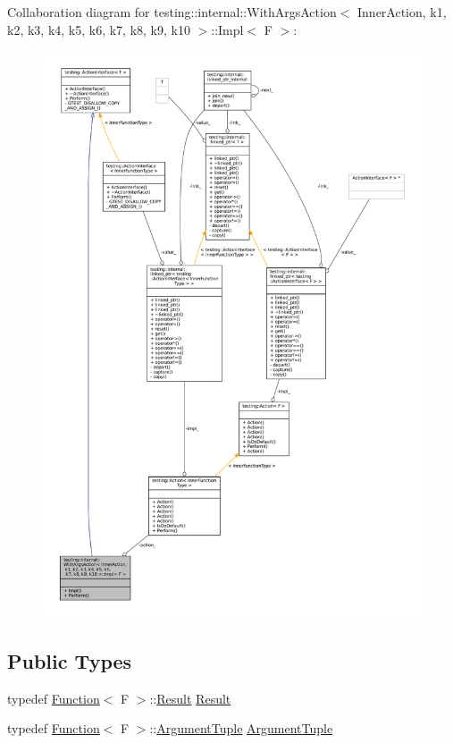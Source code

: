 Collaboration diagram for testing\+:\+:internal\+:\+:With\+Args\+Action$<$ Inner\+Action, k1, k2, k3, k4, k5, k6, k7, k8, k9, k10 $>$\+:\+:Impl$<$ F $>$\+:
\nopagebreak
\begin{figure}[H]
\begin{center}
\leavevmode
\includegraphics[width=350pt]{classtesting_1_1internal_1_1WithArgsAction_1_1Impl__coll__graph}
\end{center}
\end{figure}
\subsection*{Public Types}
\begin{DoxyCompactItemize}
\item 
typedef \hyperlink{structtesting_1_1internal_1_1Function}{Function}$<$ F $>$\+::\hyperlink{classtesting_1_1ActionInterface_a7477de2fe3e4e01c59db698203acaee7}{Result} \hyperlink{classtesting_1_1internal_1_1WithArgsAction_1_1Impl_a967047b99af8f852f4fa2883be283e1a}{Result}
\item 
typedef \hyperlink{structtesting_1_1internal_1_1Function}{Function}$<$ F $>$\+::\hyperlink{classtesting_1_1ActionInterface_af72720d864da4d606629e83edc003511}{Argument\+Tuple} \hyperlink{classtesting_1_1internal_1_1WithArgsAction_1_1Impl_ae75850936c5448a83f79267d6a2f1903}{Argument\+Tuple}
\end{DoxyCompactItemize}
